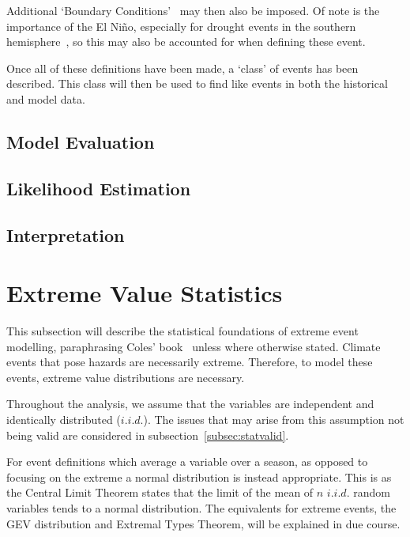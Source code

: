 \documentclass[12pt,a4paper]{report}
\begin{document}
Additional `Boundary Conditions'~\cite{van_Oldenborgh_et_al_2021} may then also be imposed.
Of note is the importance of the El Niño,
    especially for drought events in the southern hemisphere~\cite{Lyon_2004},
    so this may also be accounted for when defining these event.

Once all of these definitions have been made,
    a `class' of events has been described.
This class will then be used to find like events in both the historical and model data.

\subsection{Model Evaluation}\label{subsec:backmodeleval}

\subsection{Likelihood Estimation}\label{subsec:backlikeest}

\subsection{Interpretation}\label{subsec:backinterp}

\section{Extreme Value Statistics}\label{sec:exstats}

This subsection will describe the statistical foundations of extreme event modelling,
    paraphrasing Coles' book~\cite{Coles_2001} unless where otherwise stated.
Climate events that pose hazards are necessarily extreme.
Therefore, to model these events,
    extreme value distributions are necessary.

Throughout the analysis,
    we assume that the variables are independent and identically distributed ($i.i.d.$).
The issues that may arise from this assumption not being valid are considered in subsection~\ref{subsec:statvalid}.

For event definitions which average a variable over a season,
    as opposed to focusing on the extreme
    a normal distribution is instead appropriate.
This is as the Central Limit Theorem states that the limit of the mean of $n$ $i.i.d.$ random variables tends to a normal distribution.
The equivalents for extreme events, the GEV distribution and Extremal Types Theorem,
    will be explained in due course.
\end{document}
